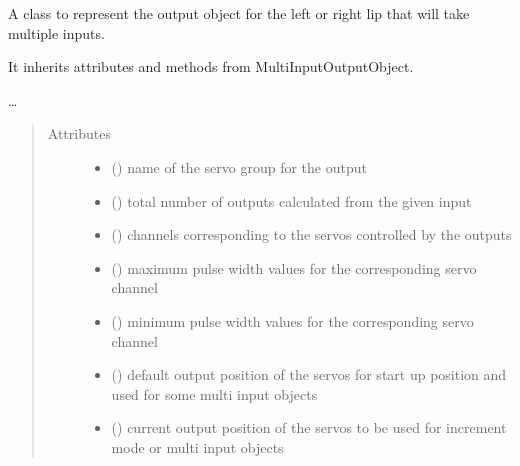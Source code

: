 \documentclass[letterpaper,10pt,english]{sphinxmanual}
\begin{document}
\begin{fulllineitems}
\label{\detokenize{specific:SideLipOutput.SideLipOutput}}
\sphinxAtStartPar
A class to represent the output object for the left or right lip 
that will take multiple inputs.

\sphinxAtStartPar
It inherits attributes and methods from MultiInputOutputObject.

\sphinxAtStartPar
…
\begin{quote}\begin{description}
\item[{Attributes}] \leavevmode\begin{itemize}
\item {} 
\sphinxAtStartPar
{}() \textendash{} name of the servo group for the output

\item {} 
\sphinxAtStartPar
{}() \textendash{} total number of outputs 
calculated from the given input

\item {} 
\sphinxAtStartPar
{}(\sphinxstyleemphasis{{[}int{]}}) \textendash{} channels corresponding to 
the servos controlled by the outputs

\item {} 
\sphinxAtStartPar
{}(\sphinxstyleemphasis{{[}int{]}}) \textendash{} maximum pulse width values 
for the corresponding servo channel

\item {} 
\sphinxAtStartPar
{}(\sphinxstyleemphasis{{[}int{]}}) \textendash{} minimum pulse width values 
for the corresponding servo channel

\item {} 
\sphinxAtStartPar
{}(\sphinxstyleemphasis{{[}int{]}}) \textendash{} default output position of 
the servos for start up position and used for some multi input 
objects

\item {} 
\sphinxAtStartPar
{}(\sphinxstyleemphasis{{[}int{]}}) \textendash{} current output position of the 
servos to be used for increment mode or multi input objects


\end{itemize}
\end{description}
\end{quote}
\end{fulllineitems}
\end{document}
